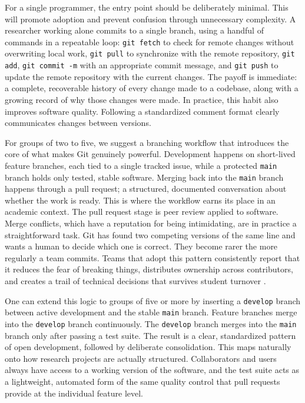 \documentclass[11pt]{article}
\begin{document}
For a single programmer, the entry point should be deliberately minimal. This will 
promote adoption and prevent confusion through unnecessary complexity. A researcher working alone commits to a 
single branch, using a handful of commands in a repeatable loop: \texttt{git fetch} to 
check for remote changes without overwriting local work, \texttt{git pull} to synchronize with the remote repository,
\texttt{git add}, \texttt{git commit -m} with an appropriate commit message, and \texttt{git push} to update the remote repository with the current changes. 
The payoff is immediate: a complete, recoverable history of every change made to a codebase, along with a growing record 
of why those changes were made. In practice, this habit also improves software quality. 
Following a standardized comment format clearly communicates changes between versions. 

For groups of two to five, we suggest a branching workflow that introduces the 
core of what makes Git genuinely powerful. Development happens on short-lived feature 
branches, each tied to a single tracked issue, while a protected \texttt{main} branch holds 
only tested, stable software. Merging back into the \texttt{main} branch happens through a pull request; a 
structured, documented conversation about whether the work is ready. This is where the 
workflow earns its place in an academic context. The pull request stage is peer review 
applied to software. Merge conflicts, which have a reputation for being intimidating, are 
in practice a straightforward task. Git has found two competing versions of the same 
line and wants a human to decide which one is correct. They become rarer the more 
regularly a team commits. Teams that adopt this pattern consistently report that it reduces 
the fear of breaking things, distributes ownership across contributors, and creates a 
trail of technical decisions that survives student turnover \cite{milliken2021}.

One can extend this logic to groups of five or more by inserting a \texttt{develop} branch between 
active development and the stable \texttt{main} branch. Feature branches merge into the \texttt{develop} branch continuously. 
The \texttt{develop} branch merges into the \texttt{main} branch only after passing a test suite. The result is a clear, standardized pattern of
open development, followed by deliberate consolidation. This maps naturally onto how 
research projects are actually structured. Collaborators and users always have access to a working 
version of the software, and the test suite acts as a lightweight, automated form of the same quality 
control that pull requests provide at the individual feature level.
\end{document}
